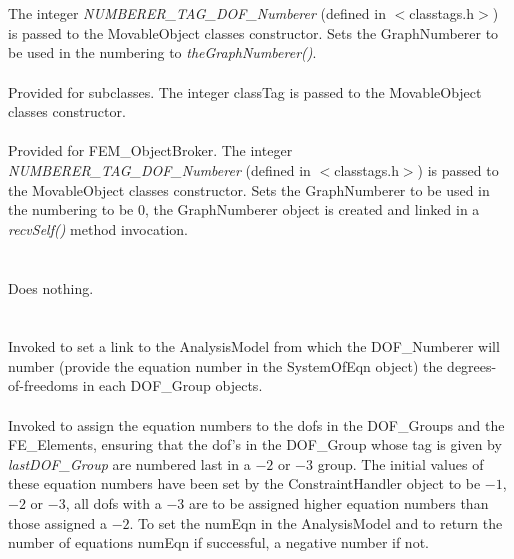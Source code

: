  \\
\\ 
The integer {\em NUMBERER\_TAG\_DOF\_Numberer}
(defined in $<$classtags.h$>$) is passed to the MovableObject classes
constructor. Sets the GraphNumberer to be used in the numbering to {\em
theGraphNumberer()}. \\

\\ 
Provided for subclasses. The integer \p classTag is passed to the
MovableObject classes constructor. \\


\\ 
Provided for FEM\_ObjectBroker. The integer {\em NUMBERER\_TAG\_DOF\_Numberer}
(defined in $<$classtags.h$>$) is passed to the MovableObject classes
constructor. Sets the GraphNumberer to be used in the numbering to be
$0$, the GraphNumberer object is created and linked in a {\em
recvSelf()} method invocation. \\


 \\
\\ 
Does nothing. \\

\\
 \\
Invoked to set a link to the AnalysisModel from which the
DOF\_Numberer will number (provide the equation number in the
SystemOfEqn object) the degrees-of-freedoms in each DOF\_Group
objects.\\  

 \\
Invoked to assign the equation numbers to the dofs in the DOF\_Groups
and the FE\_Elements, ensuring that the dof's in the DOF\_Group whose
tag is given by {\em lastDOF\_Group} are numbered last in a $-2$ or
$-3$ group. The initial values of these equation numbers have been set
by the ConstraintHandler object to be $-1$, $-2$ or $-3$, all dofs
with a $-3$ are to be assigned higher equation numbers than those
assigned a $-2$. To set the \p numEqn in the AnalysisModel and to
return the number of equations \p numEqn if successful, a negative
number if not.  

